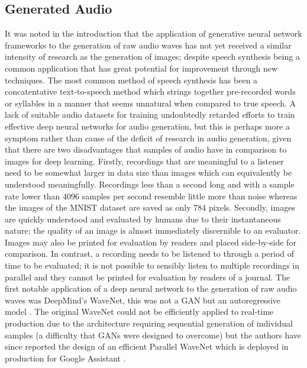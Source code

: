 \documentclass[a4paper, titlepage]{article}
\begin{document}
\subsection{Generated Audio}

It was noted in the introduction that the application of generative neural network frameworks to the generation of raw audio waves has not yet received a similar intensity of research as the generation of images; despite speech synthesis being a common application that has great potential for improvement through new techniques.
The most common method of speech synthesis has been a concatentative text-to-speech method which strings together pre-recorded words or syllables in a manner that seems unnatural when compared to true speech.
\newline
\newline
A lack of suitable audio datasets for training undoubtedly retarded efforts to train effective deep neural networks for audio generation, but this is perhaps more a symptom rather than cause of the deficit of research in audio generation, given that there are two disadvantages that samples of audio have in comparison to images for deep learning.
\newline
\newline
Firstly, recordings that are meaningful to a listener need to be somewhat larger in data size than images which can equivalently be understood meaningfully.
Recordings less than a second long and with a sample rate lower than 4096 samples per second resemble little more than noise whereas the images of the \ac{MNIST} dataset are saved as only 784 pixels.
\newline
\newline
Secondly, images are quickly understood and evaluated by humans due to their instantaneous nature; the quality of an image is almost immediately discernible to an evaluator.
Images may also be printed for evaluation by readers and placed side-by-side for comparison.
In contrast, a recording needs to be listened to through a period of time to be evaluated; it is not possible to sensibly listen to multiple recordings in parallel and they cannot be printed for evaluation by readers of a journal.
\newline
\newline
The first notable application of a deep neural network to the generation of raw audio waves was DeepMind's WaveNet, this was not a \ac{GAN} but an autoregressive model \citep{DBLP:journals/corr/OordDZSVGKSK16}.
The original WaveNet could not be efficiently applied to real-time production due to the architecture requiring sequential generation of individual samples (a difficulty that \ac{GAN}s were designed to overcome) but the authors have since reported the design of an efficient Parallel WaveNet which is deployed in production for Google Assistant \citep{2017arXiv171110433V}.
\end{document}
